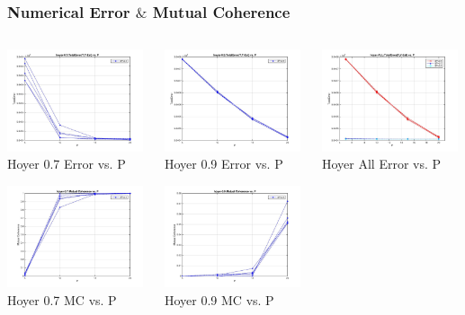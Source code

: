 \documentclass{beamer}
\begin{document}
\begin{frame}
\frametitle{Numerical Error $\&$  Mutual Coherence}
\begin{columns}
    \begin{column}{0.33\textwidth}
        \includegraphics[width=4cm,center]{hoyer-07_TotalError}
        \\  Hoyer 0.7 Error vs. P 
        \centering

        \includegraphics[width=4cm,center]{hoyer-07_Mutual_Coherence}
        \\  Hoyer 0.7 MC vs. P
        \centering
    \end{column}
    \begin{column}{0.33\textwidth}
        \includegraphics[width=4cm,center]{hoyer-09_TotalError}
        \\ Hoyer 0.9 Error vs. P 
        \centering

        \includegraphics[width=4cm,center]{hoyer-09_Mutual_Coherence}
        \\ Hoyer 0.9 MC vs. P
        \centering
    \end{column}
    \begin{column}{0.33\textwidth}
        \includegraphics[width=4cm,center]{hoyer-ALL_TotalError}
        \\ Hoyer All Error vs. P 
        \centering


\end{column}
\end{columns}
\end{frame}
\end{document}
